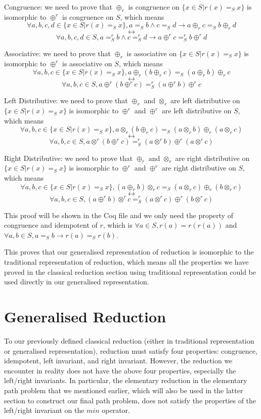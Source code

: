 \documentclass[a4paper,12pt,twoside,openright]{report}
\begin{document}
Congruence: we need to prove that $\oplus_r$ is congruence on $\{x \in S | r(x) =_S x\}$ is isomorphic to $\oplus^r$ is congruence on $S$, which means 
\[\forall a,b,c,d \in \{x \in S | r(x) =_S x \}, a =_S b \wedge c =_S d \rightarrow a \oplus_r c =_S b \oplus_r d \]
\[\longleftrightarrow \]
\[\forall a,b,c,d \in S, a =^r_S b \wedge c =^r_S d \rightarrow a \oplus^r c =^r_S b \oplus^r d
\]

Associative: we need to prove that $\oplus_r$ is associative on $\{x \in S | r(x) =_S x\}$ is isomorphic to $\oplus^r$ is associative on $S$, which means 
\[\forall a,b,c \in \{x \in S | r(x) =_S x \}, a \oplus_r (b \oplus_r c) =_S (a \oplus_r b) \oplus_r c \]
\[\longleftrightarrow \]
\[\forall a,b,c \in S, a \oplus^r (b \oplus^r c) =^r_S (a \oplus^r b) \oplus^r c
\]

Left Distributive: we need to prove that $\oplus_r$ and $\otimes_r$ are left distributive on $\{x \in S | r(x) =_S x\}$ is isomorphic to $\oplus^r$ and $\oplus^r$ are left distributive on $S$, which means 
\[\forall a,b,c \in \{x \in S | r(x) =_S x \}, a \otimes_r (b \oplus_r c) =_S (a \otimes_r b) \oplus_r (a \otimes_r c) \]
\[\longleftrightarrow \]
\[\forall a,b,c \in S, a \otimes^r (b \oplus^r c) =^r_S (a \otimes^r b) \oplus^r (a \otimes^r c)
\]

Right Distributive: we need to prove that $\oplus_r$ and $\otimes_r$ are right distributive on $\{x \in S | r(x) =_S x\}$ is isomorphic to $\oplus^r$ and $\oplus^r$ are right distributive on $S$, which means 
\[\forall a,b,c \in \{x \in S | r(x) =_S x \}, (a \oplus_r b) \otimes_r c =_S (a \otimes_r c) \oplus_r (b \otimes_r c) \]
\[\longleftrightarrow \]
\[\forall a,b,c \in S, (a \oplus^r b) \otimes^r c =^r_S (a \otimes^r c) \oplus^r (b \otimes^r c)
\]

This proof will be shown in the Coq file and we only need the property of congruence and idempotent of $r$, which is $\forall a \in S, r(a) = r(r(a))$ and $\forall a,b \in S, a =_S b \rightarrow r(a) =_S r(b)$.

This proves that our generalised representation of reduction is isomorphic to the traditional representation of reduction, which means all the properties we have proved in the classical reduction section using traditional representation could be used directly in our generalised representation.

\section{Generalised Reduction}
To our previously defined classical reduction (either in traditional representation or generalised representation), reduction must satisfy four properties: congruence, idempotent, left invariant, and right invariant. However, the reduction we encounter in reality does not have the above four properties, especially the left/right invariants. In particular, the elementary reduction in the elementary path problem that we mentioned earlier, which will also be used in the latter section to construct our final path problem, does not satisfy the properties of the left/right invariant on the $min$ operator. 
\end{document}
